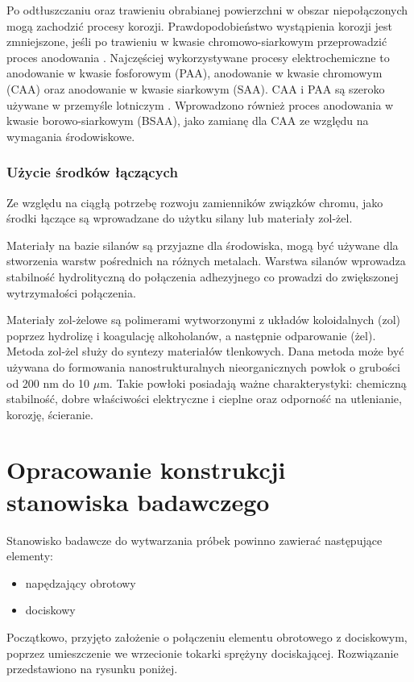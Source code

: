 \documentclass[magister,druk]{dyplom}
\begin{document}
Po odtłuszczaniu oraz trawieniu obrabianej powierzchni w obszar niepołączonych mogą zachodzić procesy korozji. Prawdopodobieństwo wystąpienia korozji jest zmniejszone, jeśli po trawieniu w kwasie chromowo-siarkowym przeprowadzić proces anodowania \cite{anod}. Najczęściej wykorzystywane procesy elektrochemiczne to anodowanie w kwasie fosforowym (PAA), anodowanie w kwasie chromowym (CAA) oraz anodowanie w kwasie siarkowym (SAA). CAA i PAA są szeroko używane w przemyśle lotniczym \cite{aero}. Wprowadzono również proces anodowania w kwasie borowo-siarkowym (BSAA), jako zamianę dla CAA ze względu na wymagania środowiskowe.   

\subsection{Użycie środków łączących}

Ze względu na ciągłą potrzebę rozwoju zamienników związków chromu, jako środki łączące są wprowadzane do użytku silany lub materiały zol-żel. 


Materiały na bazie silanów są przyjazne dla środowiska, mogą być używane dla stworzenia warstw pośrednich na różnych metalach. Warstwa silanów wprowadza stabilność hydrolityczną do połączenia adhezyjnego co prowadzi do zwiększonej wytrzymałości połączenia.

Materiały zol-żelowe są polimerami wytworzonymi z układów koloidalnych (zol) poprzez hydrolizę i koagulację alkoholanów, a następnie odparowanie (żel). Metoda zol-żel służy do syntezy materiałów tlenkowych. Dana metoda może być używana do formowania nanostrukturalnych nieorganicznych powłok o grubości od 200 nm do 10 $\mu$m. Takie powłoki posiadają ważne charakterystyki: chemiczną stabilność, dobre właściwości elektryczne i cieplne oraz odporność na utlenianie, korozję, ścieranie. 


\chapter{Opracowanie konstrukcji stanowiska badawczego}

Stanowisko badawcze do wytwarzania próbek powinno zawierać następujące elementy:
\begin{itemize}
	\item napędzający obrotowy
	\item dociskowy
\end{itemize} 

Początkowo, przyjęto założenie o połączeniu elementu obrotowego z dociskowym, poprzez umieszczenie we wrzecionie tokarki sprężyny dociskającej. Rozwiązanie przedstawiono na rysunku poniżej.
\end{document}
